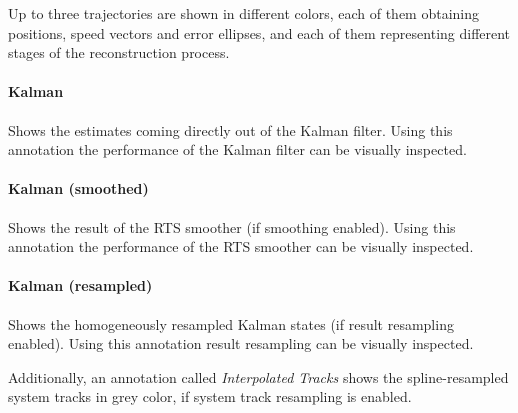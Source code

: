 Up to three trajectories are shown in different colors, each of them obtaining positions, speed vectors and error ellipses,
and each of them representing different stages of the reconstruction process.

\paragraph{Kalman} Shows the estimates coming directly out of the Kalman filter.
Using this annotation the performance of the Kalman filter can be visually inspected.


\paragraph{Kalman (smoothed)} Shows the result of the RTS smoother (if smoothing enabled).
Using this annotation the performance of the RTS smoother can be visually inspected.


\paragraph{Kalman (resampled)} Shows the homogeneously resampled Kalman states (if result resampling enabled).
Using this annotation result resampling can be visually inspected.


Additionally, an annotation called \textit{Interpolated Tracks} shows the spline-resampled system tracks in grey color,
if system track resampling is enabled.
% 
